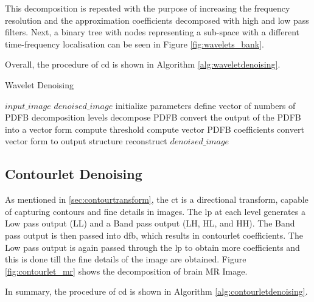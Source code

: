 This decomposition is repeated with the purpose of increasing the frequency resolution and the approximation coefficients decomposed with high and low pass filters. Next, a binary tree with nodes representing a sub-space with a different time-frequency localisation can be seen in Figure \ref{fig:wavelets_bank}.


Overall, the procedure of \gls{cd} is shown in Algorithm \ref{alg:waveletdenoising}.


\begin{algorithm}[h]
	\caption{Wavelet Denoising}\label{alg:waveletdenoising}
	\begin{algorithmic}[1]
		\Require $input\_image$
		\Ensure $denoised\_image$
			\State initialize parameters
			\State define vector of numbers of PDFB decomposition levels  
			\State decompose PDFB 
			\State convert the output of the PDFB into a vector form 
			\State compute threshold 
			\State compute vector PDFB coefficients 
			\State convert vector form to output structure 
			\State reconstruct $denoised\_image$ 
		\EndProcedure
	\end{algorithmic}
\end{algorithm}


\subsection{Contourlet Denoising}


As mentioned in \ref{sec:contourtransform}, the \gls{ct} is a directional transform, capable of capturing contours and fine details in images. The \gls{lp} at each level generates a Low pass output (LL) and a Band pass output (LH, HL, and HH). The Band pass output is then passed into \gls{dfb}, which
results in contourlet coefficients. The Low pass output is again passed through the \gls{lp} to obtain more coefficients and this is done till the fine details of the image are obtained. Figure \ref{fig:contourlet_mr} shows the decomposition of brain MR Image. 

In summary, the procedure of \gls{cd} is shown in Algorithm \ref{alg:contourletdenoising}.


